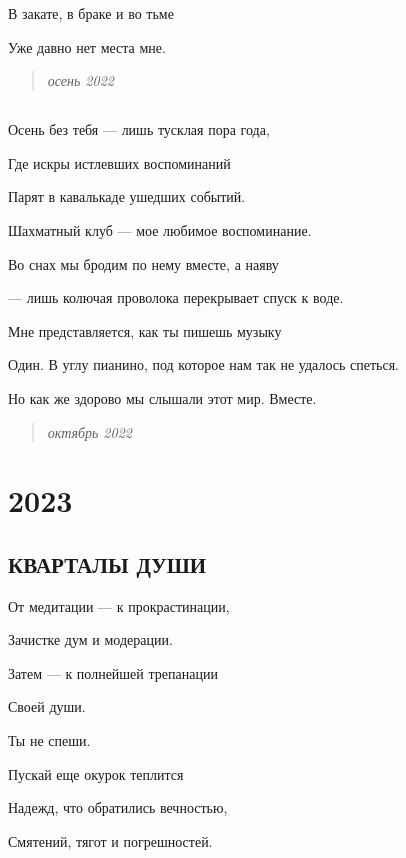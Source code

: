 \documentclass[
  a5paperpaper,
  DIV=11,
  numbers=noendperiod]{scrreprt}
\begin{document}
В закате, в браке и во тьме

Уже давно нет места мне.

\begin{quote}
\emph{осень 2022}
\end{quote}

\section{}\label{section-15}

Осень без тебя --- лишь тусклая пора года,

Где искры истлевших воспоминаний

Парят в кавалькаде ушедших событий.

Шахматный клуб --- мое любимое воспоминание.

Во снах мы бродим по нему вместе, а наяву

--- лишь колючая проволока перекрывает спуск к воде.

Мне представляется, как ты пишешь музыку

Один. В углу пианино, под которое нам так не удалось спеться.

Но как же здорово мы слышали этот мир. Вместе.

\begin{quote}
\emph{октябрь 2022}
\end{quote}


\chapter{2023}\label{section-16}

\section{КВАРТАЛЫ
ДУШИ}\label{ux43aux432ux430ux440ux442ux430ux43bux44b-ux434ux443ux448ux438}

От медитации --- к прокрастинации,

Зачистке дум и модерации.

Затем --- к полнейшей трепанации

Своей души.

Ты не спеши.

Пускай еще окурок теплится

Надежд, что обратились вечностью,

Смятений, тягот и погрешностей.
\end{document}
